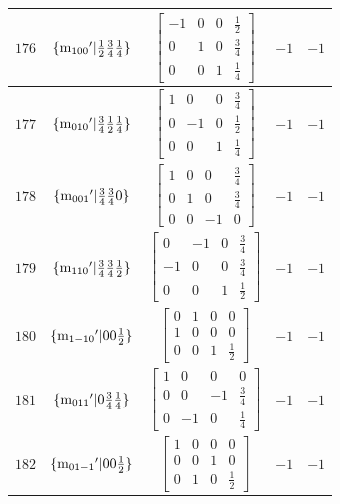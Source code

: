 \documentclass[fleqn,8pt]{jsarticle}
\begin{document}
\begin{longtable}{ccccc}
$ 176 $ & $ \{{\rm m}_{100}{}'|\frac{1}{2} \frac{3}{4} \frac{1}{4}\} $ & $ \begin{bmatrix} -1 & 0 & 0 & \frac{1}{2} \\ 0 & 1 & 0 & \frac{3}{4} \\ 0 & 0 & 1 & \frac{1}{4} \end{bmatrix} $ & $ -1 $ & $ -1 $ \\ \hline
$ 177 $ & $ \{{\rm m}_{010}{}'|\frac{3}{4} \frac{1}{2} \frac{1}{4}\} $ & $ \begin{bmatrix} 1 & 0 & 0 & \frac{3}{4} \\ 0 & -1 & 0 & \frac{1}{2} \\ 0 & 0 & 1 & \frac{1}{4} \end{bmatrix} $ & $ -1 $ & $ -1 $ \\ \hline
$ 178 $ & $ \{{\rm m}_{001}{}'|\frac{3}{4} \frac{3}{4} 0\} $ & $ \begin{bmatrix} 1 & 0 & 0 & \frac{3}{4} \\ 0 & 1 & 0 & \frac{3}{4} \\ 0 & 0 & -1 & 0 \end{bmatrix} $ & $ -1 $ & $ -1 $ \\ \hline
$ 179 $ & $ \{{\rm m}_{110}{}'|\frac{3}{4} \frac{3}{4} \frac{1}{2}\} $ & $ \begin{bmatrix} 0 & -1 & 0 & \frac{3}{4} \\ -1 & 0 & 0 & \frac{3}{4} \\ 0 & 0 & 1 & \frac{1}{2} \end{bmatrix} $ & $ -1 $ & $ -1 $ \\ \hline
$ 180 $ & $ \{{\rm m}_{1-10}{}'|0 0 \frac{1}{2}\} $ & $ \begin{bmatrix} 0 & 1 & 0 & 0 \\ 1 & 0 & 0 & 0 \\ 0 & 0 & 1 & \frac{1}{2} \end{bmatrix} $ & $ -1 $ & $ -1 $ \\ \hline
$ 181 $ & $ \{{\rm m}_{011}{}'|0 \frac{3}{4} \frac{1}{4}\} $ & $ \begin{bmatrix} 1 & 0 & 0 & 0 \\ 0 & 0 & -1 & \frac{3}{4} \\ 0 & -1 & 0 & \frac{1}{4} \end{bmatrix} $ & $ -1 $ & $ -1 $ \\ \hline
$ 182 $ & $ \{{\rm m}_{01-1}{}'|0 0 \frac{1}{2}\} $ & $ \begin{bmatrix} 1 & 0 & 0 & 0 \\ 0 & 0 & 1 & 0 \\ 0 & 1 & 0 & \frac{1}{2} \end{bmatrix} $ & $ -1 $ & $ -1 $ \\ \hline

\end{longtable}
\end{document}
